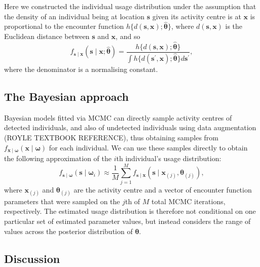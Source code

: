 \documentclass[10pt,a4paper]{article}\usepackage[]{graphicx}\usepackage[]{color}
\begin{document}
 Here we constructed
the individual usage distribution under the assumption that the
density of an individual being at location $\bm{s}$ given its activity
centre is at $\bm{x}$ is proportional to the encounter function
$h\{d(\bm{s}, \bm{x}); \widehat{\bm{\theta}}\}$, where $d(\bm{s},
\bm{x})$ is the Euclidean distance between $\bm{s}$ and $\bm{x}$, and
so
\begin{equation}
  f_{\bm{s} \mid \bm{x}}(\bm{s} \mid \bm{x}; \widehat{\bm{\theta}}) = \frac{h\{d(\bm{s}, \bm{x}); \widehat{\bm{\theta}}\}}{\int h\{d(\bm{s}^\prime, \bm{x}); \widehat{\bm{\theta}}\} d\bm{s}^\prime},
\end{equation}
where the denominator is a normalising constant.
\subsection{The Bayesian approach}

Bayesian models fitted via MCMC can directly sample activity centres
of detected individuals, and also of undetected individuals using data
augmentation (ROYLE TEXTBOOK REFERENCE), thus obtaining samples from
$f_{\bm{x} \mid \bm{\omega}}(\bm{x} \mid \bm{\omega})$ for each
individual. We can use these samples directly to obtain the following
approximation of the $i$th individual's usage distribution:
\begin{equation}
  f_{\bm{s} \mid \bm{\omega}}(\bm{s} \mid \bm{\omega}_i) \approx
  \frac{1}{M} \sum_{j = 1}^M f_{\bm{s} \mid \bm{x}}(\bm{s} \mid
  \bm{x}_{(j)}, \bm{\theta}_{(j)}),
\end{equation}
where $\bm{x}_{(j)}$ and $\bm{{\theta}}_{(j)}$ are the
activity centre and a vector of encounter function parameters that
were sampled on the $j$th of $M$ total MCMC iterations,
respectively. The estimated usage distribution is therefore not
conditional on one particular set of estimated parameter values, but
instead considers the range of values across the posterior
distribution of $\bm{\theta}$.

\subsection{Discussion}
\end{document}

